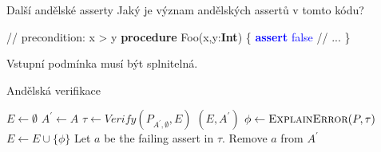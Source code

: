 \documentclass[11pt]{beamer}
\begin{document}
\begin{frame}[fragile]{Další andělské asserty}
Jaký je význam andělských assertů v tomto kódu?
\begin{semiverbatim}
// precondition: x > y
\textbf{procedure} Foo(x,y:\textbf{Int}) \{
  \textcolor{blue}{\textbf{assert} false}
  // ...
\}
\end{semiverbatim}
\pause Vstupní podmínka musí být splnitelná.
\end{frame}

\begin{frame}{Andělská verifikace}
\begin{algorithmic} \small
\State $E \gets \emptyset$
\State $A^\prime \gets A$
\Loop
  \State $\tau \gets \textit{Verify}(P_{A^\prime, \emptyset}, E)$
  	\Return $\left( E, A^\prime \right)$
  \EndIf
  \State $\phi \gets \textsc{ExplainError}(P, \tau)$
    \State $E \gets E \cup \{ \phi \}$
  \Else
  	\State Let $a$ be the failing assert in $\tau$.
  	\State Remove $a$ from $A^\prime$
  \EndIf
\EndLoop
\end{algorithmic}
\end{frame}



\end{document}
